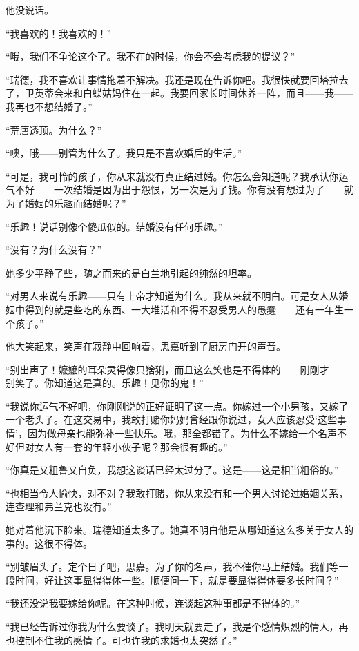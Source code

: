 \par 他没说话。
\par “我喜欢的！我喜欢的！”
\par “哦，我们不争论这个了。我不在的时候，你会不会考虑我的提议？”
\par “瑞德，我不喜欢让事情拖着不解决。我还是现在告诉你吧。我很快就要回塔拉去了，卫英蒂会来和白蝶姑妈住在一起。我要回家长时间休养一阵，而且——我——我再也不想结婚了。”
\par “荒唐透顶。为什么？”
\par “噢，哦——别管为什么了。我只是不喜欢婚后的生活。”
\par “可是，我可怜的孩子，你从来就没有真正结过婚。你怎么会知道呢？我承认你运气不好——一次结婚是因为出于怨恨，另一次是为了钱。你有没有想过为了——就为了婚姻的乐趣而结婚呢？”
\par “乐趣！说话别像个傻瓜似的。结婚没有任何乐趣。”
\par “没有？为什么没有？”
\par 她多少平静了些，随之而来的是白兰地引起的纯然的坦率。
\par “对男人来说有乐趣——只有上帝才知道为什么。我从来就不明白。可是女人从婚姻中得到的就是些吃的东西、一大堆活和不得不忍受男人的愚蠢——还有一年生一个孩子。”
\par 他大笑起来，笑声在寂静中回响着，思嘉听到了厨房门开的声音。
\par “别出声了！嬷嬷的耳朵灵得像只猞猁，而且这么笑也是不得体的——刚刚才——别笑了。你知道这是真的。乐趣！见你的鬼！”
\par “我说你运气不好吧，你刚刚说的正好证明了这一点。你嫁过一个小男孩，又嫁了一个老头子。在这交易中，我敢打赌你妈妈曾经跟你说过，女人应该忍受‘这些事情’，因为做母亲也能弥补一些快乐。哦，那全都错了。为什么不嫁给一个名声不好但对女人有一套的年轻小伙子呢？那会很有趣的。”
\par “你真是又粗鲁又自负，我想这谈话已经太过分了。这是——这是相当粗俗的。”
\par “也相当令人愉快，对不对？我敢打赌，你从来没有和一个男人讨论过婚姻关系，连查理和弗兰克也没有。”
\par 她对着他沉下脸来。瑞德知道太多了。她真不明白他是从哪知道这么多关于女人的事的。这很不得体。
\par “别皱眉头了。定个日子吧，思嘉。为了你的名声，我不催你马上结婚。我们等一段时间，好让这事显得得体一些。顺便问一下，就是要显得得体要多长时间？”
\par “我还没说我要嫁给你呢。在这种时候，连谈起这种事都是不得体的。”
\par “我已经告诉过你我为什么要谈了。我明天就要走了，我是个感情炽烈的情人，再也控制不住我的感情了。可也许我的求婚也太突然了。”
